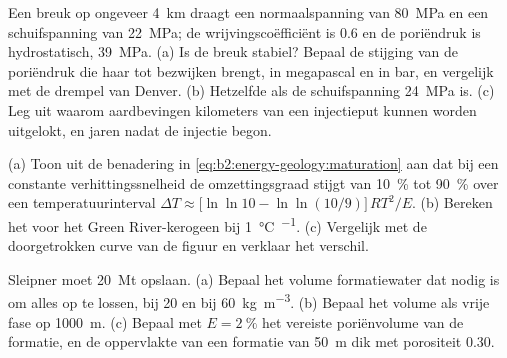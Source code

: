 \begin{exercise}[$\star\star\star$]\label{exo:b2:energy-geology:10}
Een breuk op ongeveer \qty{4}{km} draagt een normaalspanning van \qty{80}{MPa} en een schuifspanning van
\qty{22}{MPa}; de wrijvingscoëfficiënt is 0.6 en de poriëndruk is hydrostatisch,
\qty{39}{MPa}. (a) Is de breuk stabiel? Bepaal de stijging van de poriëndruk die haar tot bezwijken brengt, in
megapascal en in bar, en vergelijk met de drempel van Denver. (b) Hetzelfde als de schuifspanning
\qty{24}{MPa} is. (c) Leg uit waarom aardbevingen kilometers van een injectieput kunnen worden uitgelokt,
en jaren nadat de injectie begon.
\end{exercise}

\begin{exercise}[$\star\star\star$]\label{exo:b2:energy-geology:11}
(a) Toon uit de benadering in \eqref{eq:b2:energy-geology:maturation} aan dat bij een constante
verhittingssnelheid de omzettingsgraad stijgt van \qty{10}{\percent} tot \qty{90}{\percent} over een
temperatuurinterval $\Delta T \approx \bigl[\ln\ln 10 - \ln\ln(10/9)\bigr]\,RT^2/E$. (b) Bereken het
voor het Green River-kerogeen bij \qty{1}{\celsius\per\Myr}. (c) Vergelijk met de doorgetrokken curve van de
figuur en verklaar het verschil.
\end{exercise}

\begin{exercise}[$\star\star\star$]\label{exo:b2:energy-geology:12}
Sleipner moet \qty{20}{Mt}  opslaan. (a) Bepaal het volume formatiewater dat nodig is om
alles op te lossen, bij 20 en bij \qty{60}{kg.m^{-3}}. (b) Bepaal het volume als vrije fase op
\qty{1000}{m}. (c) Bepaal met $E = \qty{2}{\percent}$ het vereiste poriënvolume van de formatie, en
de oppervlakte van een formatie van \qty{50}{m} dik met porositeit 0.30.
\end{exercise}

